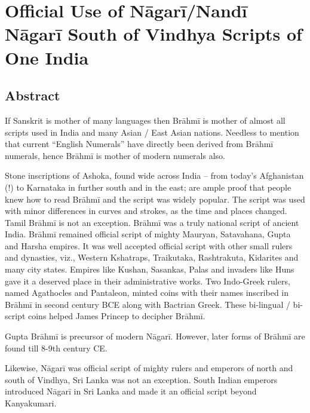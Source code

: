 
\chapter{Official Use of Nāgarī/Nandī Nāgarī South of Vindhya Scripts of One India}\label{chapter5}



\section*{Abstract}

If Sanskrit is mother of many languages then Brāhmī is mother of almost all scripts used in India and many Asian / East Asian nations. Needless to mention that current “English Numerals” have directly been derived from Brāhmī numerals, hence Brāhmī is mother of modern numerals also.

Stone inscriptions of Ashoka, found wide across India – from today’s Afghanistan (!) to Karnataka in further south and in the east; are ample proof that people knew how to read Brāhmī and the script was widely popular. The script was used with minor differences in curves and strokes, as the time and places changed. Tamil Brāhmī is not an exception. Brāhmī was a truly national script of ancient India. Brāhmī remained official script of mighty Mauryan, Satavahana, Gupta and Harsha empires. It was well accepted official script with other small rulers and dynasties, viz., Western Kshatraps, Traikutaka, Rashtrakuta, Kidarites and many city states. Empires like Kushan, Sasankas, Palas and invaders like Huns gave it a deserved place in their administrative works. Two Indo-Greek rulers, named Agathocles and Pantaleon, minted coins with their names inscribed in Brāhmī in second century BCE along with Bactrian Greek. These bi-lingual / bi-script coins helped James Princep to decipher Brāhmī.

Gupta Brāhmī is precursor of modern Nāgarī. However, later forms of Brāhmī are found till 8-9th century CE.

Likewise, Nāgarī was official script of mighty rulers and emperors of north and south of Vindhya, Sri Lanka was not an exception. South Indian emperors introduced Nāgarī in Sri Lanka and made it an official script beyond Kanyakumari.

